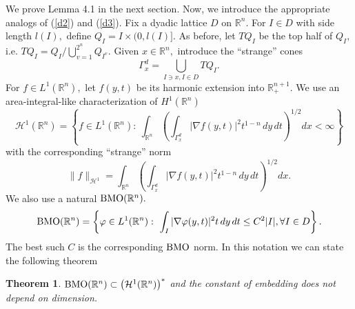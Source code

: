 \documentclass[psamsfonts]{conm-p-l}
\newtheorem{theorem}{Theorem}[section]
\theoremstyle{definition}
\theoremstyle{remark}
\numberwithin{equation}{section}
\begin{document}
We prove Lemma 4.1 in the next section. Now, we introduce the appropriate analogs of (\ref{d2}) and (\ref{d3}). Fix a dyadic lattice $D$ on $\mathbb{R}^n.$ For $I\in D$ with side length $l(I),$ define $Q_I=I\times (0,l(I)].$ As before, let $TQ_I$ be the top half of $Q_I,$ i.e. $TQ_I=Q_I/\bigcup_{v=1}^{2^n}Q_{I^v}.$  Given $x\in \mathbb{R}^n,$ introduce the ``strange'' cones
$$
\Gamma_x^d=\bigcup_{I\ni x,I\in D}TQ_I.
$$
For $f\in L^1(\mathbb{R}^n),$ let $f(y,t)$ be its harmonic extension into $\mathbb{R}_+^{n+1}.$ We use an area-integral-like characterization of $H^1(\mathbb{R}^n)$
$$
\mathcal{H}^1(\mathbb{R}^n)=\left\{f\in L^1(\mathbb{R}^n):~\int_{\mathbb{R}^n}\left(\int_{\Gamma_x^d}
|\nabla f(y,t)|^2t^{1-n}\,dy\,dt\right)^{1/2}dx<\infty\right\}
$$
with the corresponding ``strange'' norm
{\begin{equation}\label{d111}{
\|f\|_{\mathcal{H}^1}=\int_{\mathbb{R}^n}\left(\int_{\Gamma_x^d}
|\nabla f(y,t)|^2t^{1-n}\,dy\,dt\right)^{1/2}dx.
}\end{equation}}
We also use a natural ${{\rm{BMO}}}(\mathbb{R}^n).$
$$
{{\rm{BMO}}}(\mathbb{R}^n)=\left\{\varphi\in L^1(\mathbb{R}^n):~\int_I |\nabla \varphi(y,t)|^2t\,dy\,dt\le C^2|I|,\forall I\in D\right\}.
$$
The best such $C$ is the corresponding ${{\rm{BMO}}}$ norm. In this notation we can state the following theorem 
\begin{theorem}
${{\rm{BMO}}}(\mathbb{R}^n)\subset \left(\mathcal{H}^1(\mathbb{R}^n)\right)^*$ and the constant of embedding does not depend on dimension.
\end{theorem}
\end{document}
